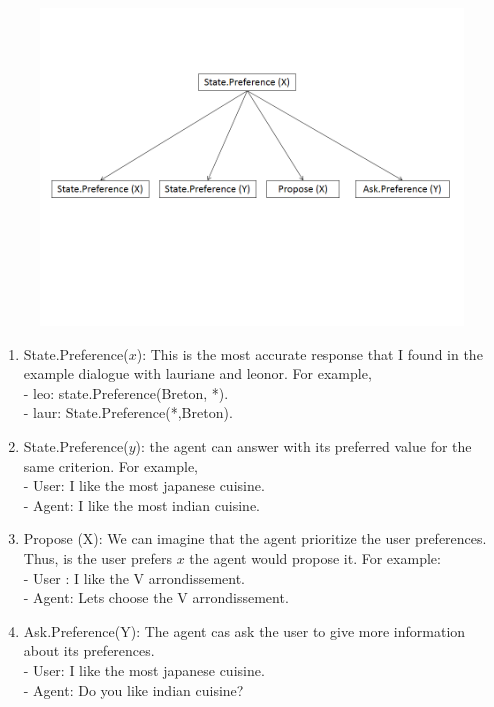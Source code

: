 \documentclass{llncs}
\begin{document}
\begin{figure}[h]
\centerline{\includegraphics[width=5in]{figs/state.PNG}}

\end{figure}
\begin{enumerate}
\item State.Preference($x$): This is the most accurate response that I found in the example dialogue with lauriane and leonor. 
For example, 
\\ - leo: state.Preference(Breton, *).
\\ - laur: State.Preference(*,Breton).

\item State.Preference($y$): the agent can answer with its preferred value for the same criterion. For example,
\\ - User: I like the most japanese cuisine.
\\ - Agent: I like the most indian cuisine.

\item Propose (X): We can imagine that the agent prioritize the user preferences. Thus, is the user prefers $x$ the agent would propose it.
For example:
\\- User : I like the V arrondissement.
\\- Agent: Lets choose the V arrondissement. 

\item Ask.Preference(Y): The agent cas ask the user to give more information about its preferences.
\\ - User: I like the most japanese cuisine.
\\ - Agent: Do you like indian cuisine? 
\end{enumerate}
\end{document}
